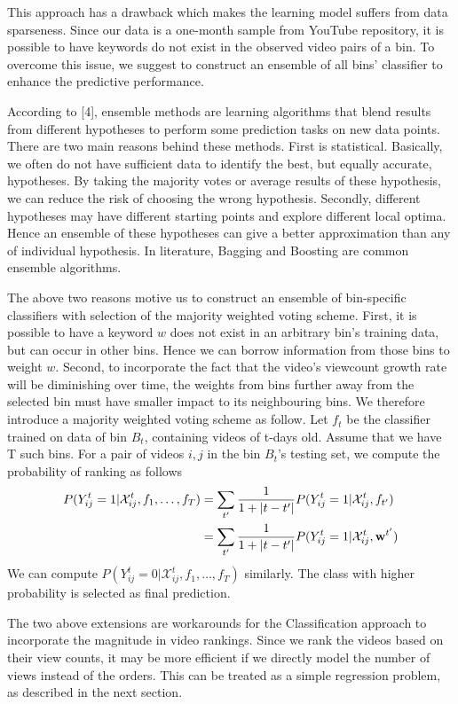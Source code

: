 	This approach has a drawback which makes the learning model suffers from data sparseness. Since our data is a one-month sample from YouTube repository, it is possible to have keywords do not exist in the observed video pairs of a bin. To overcome this issue, we suggest to construct an ensemble of all bins' classifier to enhance the predictive performance. 

	According to [4], ensemble methods are learning algorithms that blend results from different hypotheses to perform some prediction tasks on new data points. There are two main reasons behind these methods. First is statistical. Basically, we often do not have sufficient data to identify the best, but equally accurate, hypotheses. By taking the majority votes or average results of these hypothesis, we can reduce the risk of choosing the wrong hypothesis. Secondly, different hypotheses may have different starting points and explore different local optima. Hence an ensemble of these hypotheses can give a better approximation than any of individual hypothesis. In literature, Bagging and Boosting are common ensemble algorithms. 

	The above two reasons motive us to construct an ensemble of bin-specific classifiers with selection of the majority weighted voting scheme. First, it is possible to have a keyword $w$ does not exist in an arbitrary bin's training data, but can occur in other bins. Hence we can borrow information from those bins to weight $w$. Second, to incorporate the fact that the video's viewcount growth rate will be diminishing over time, the weights from bins further away from the selected bin must have smaller impact to its neighbouring bins. We therefore introduce a majority weighted voting scheme as follow. Let $f_t$ be the classifier trained on data of bin $B_t$, containing videos of t-days old. Assume that we have T such bins. For a pair of videos $i, j$ in the bin $B_t$'s testing set, we compute the probability of ranking as follows
		\begin{align}
			P(Y_{ij}^t = 1 | \mathcal{X}_{ij}^t, f_1, \ldots, f_T) &= \sum_{t'} \frac{1}{1+|t - t'|} P(Y_{ij}^t = 1 | \mathcal{X}_{ij}^t, f_{t'}) \\ \notag 
			&= \sum_{t'} \frac{1}{1+|t - t'|} P(Y_{ij}^t = 1 | \mathcal{X}_{ij}^t, \textbf{w}^{t'})
		\end{align}
		We can compute $P(Y_{ij}^t = 0 | \mathcal{X}_{ij}^t, f_1, \ldots, f_T)$ similarly. The class with higher probability is selected as final prediction. 

	The two above extensions are workarounds for the Classification approach to incorporate the magnitude in video rankings. Since we rank the videos based on their view counts, it may be more efficient if we directly model the number of views instead of the orders. This can be treated as a simple regression problem, as described in the next section.  